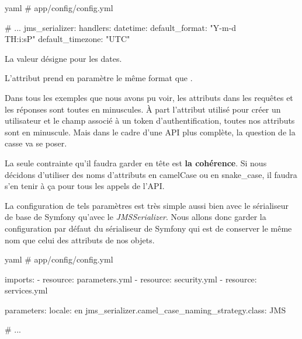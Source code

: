 \documentclass[big]{zmdocument}
\begin{document}
\begin{CodeBlock}{yaml}
# app/config/config.yml

# ...
jms_serializer:
    handlers:
        datetime:
            default_format: "Y-m-d\\TH:i:sP"
            default_timezone: "UTC"
\end{CodeBlock}



La valeur  désigne  pour les dates.



\begin{Information}
L'attribut  prend en paramètre le même format que .
\end{Information}




Dans tous les exemples que nous avons pu voir, les attributs dans les requêtes et les réponses sont toutes en minuscules.
À part l'attribut  utilisé pour créer un utilisateur et le champ  associé à un token d'authentification, toutes nos attributs sont en minuscule. Mais dans le cadre d'une API plus complète, la question de la casse va se poser.



La seule contrainte qu'il faudra garder en tête est \textbf{la cohérence}. Si nous décidons d'utiliser des noms d'attributs en camelCase ou en snake\_case, il faudra s'en tenir à ça pour tous les appels de l'API.



La configuration de tels paramètres est très simple aussi bien avec le sérialiseur de base de Symfony qu'avec le \textit{JMSSerializer}. Nous allons donc garder la configuration par défaut du sérialiseur de Symfony qui est de conserver le même nom que celui des attributs de nos objets.



\begin{CodeBlock}{yaml}
# app/config/config.yml

imports:
    - { resource: parameters.yml }
    - { resource: security.yml }
    - { resource: services.yml }

parameters:
    locale: en
    jms_serializer.camel_case_naming_strategy.class: JMS\Serializer\Naming\IdenticalPropertyNamingStrategy

# ...
\end{CodeBlock}
\end{document}
